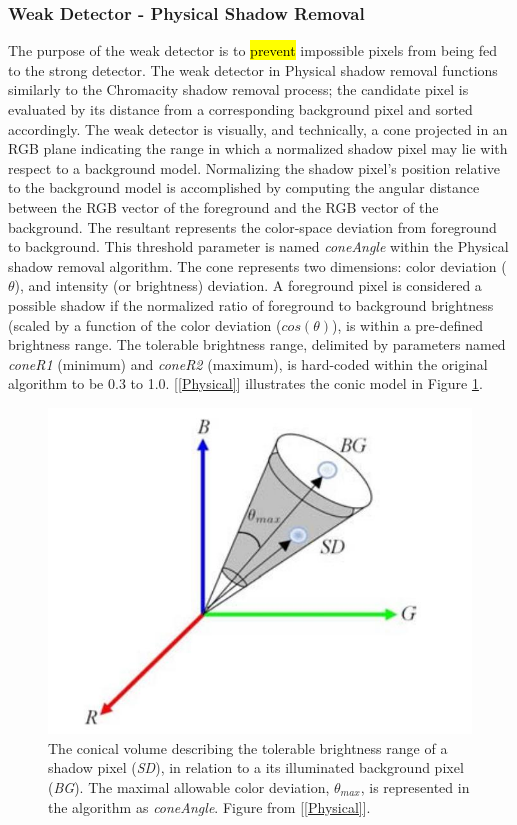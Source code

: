 \subsubsection{Weak Detector - Physical Shadow Removal}

The purpose of the weak detector is to \hl{prevent} impossible pixels from being fed to the strong detector. The weak detector in Physical shadow removal functions similarly to the Chromacity shadow removal process; the candidate pixel is evaluated by its distance from a corresponding background pixel and sorted accordingly. The weak detector is visually, and technically, a cone projected in an RGB plane indicating the range in which a normalized shadow pixel may lie with respect to a background model. Normalizing the shadow pixel's position relative to the background model is accomplished by computing the angular distance between the RGB vector of the foreground and the RGB vector of the background. The resultant represents the color-space deviation from foreground to background. This threshold parameter is named \textit{coneAngle} within the Physical shadow removal algorithm. The cone represents two dimensions: color deviation ($\theta$), and intensity (or brightness) deviation. A foreground pixel is considered a possible shadow if the normalized ratio of foreground to background brightness (scaled by a function of the color deviation ($cos(\theta)$), is within a pre-defined brightness range. The tolerable brightness range, delimited by parameters named \textit{coneR1} (minimum) and \textit{coneR2} (maximum), is hard-coded within the original algorithm to be 0.3 to 1.0. [\ref{Physical}] illustrates the conic model in Figure \ref{fig:cone_physical}.

\begin{figure}
  \centering
  \includegraphics[width=.8\linewidth]{figures/cone_physical.jpg}
  \caption{The conical volume describing the tolerable brightness range of a shadow pixel (\textit{SD}), in relation to a its illuminated background pixel (\textit{BG}). The maximal allowable color deviation, $\theta_{max}$, is represented in the algorithm as \textit{coneAngle}. Figure from [\ref{Physical}].}
  \label{fig:cone_physical}
\end{figure}

